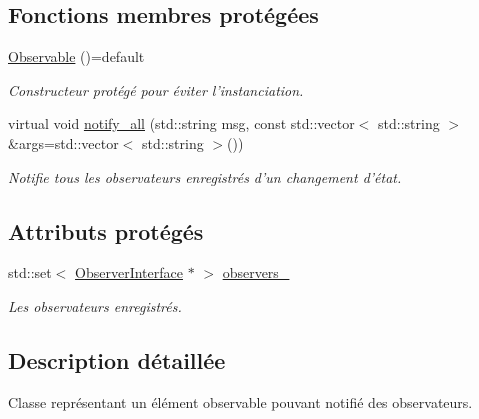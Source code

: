 \subsection*{Fonctions membres protégées}
\begin{DoxyCompactItemize}
\item 
\hypertarget{classObservable_ab3559b2daa90b06b123089508b3d193d}{\hyperlink{classObservable_ab3559b2daa90b06b123089508b3d193d}{Observable} ()=default}\label{classObservable_ab3559b2daa90b06b123089508b3d193d}

\begin{DoxyCompactList}\small\item\em Constructeur protégé pour éviter l'instanciation. \end{DoxyCompactList}\item 
\hypertarget{classObservable_a0ea369066b16b465fa95c975cd69615a}{virtual void \hyperlink{classObservable_a0ea369066b16b465fa95c975cd69615a}{notify\+\_\+all} (std\+::string msg, const std\+::vector$<$ std\+::string $>$ \&args=std\+::vector$<$ std\+::string $>$())}\label{classObservable_a0ea369066b16b465fa95c975cd69615a}

\begin{DoxyCompactList}\small\item\em Notifie tous les observateurs enregistrés d'un changement d'état. \end{DoxyCompactList}\end{DoxyCompactItemize}
\subsection*{Attributs protégés}
\begin{DoxyCompactItemize}
\item 
\hypertarget{classObservable_aadd5f7cdec9b55bfb230771dfb77a7f3}{std\+::set$<$ \hyperlink{classObserverInterface}{Observer\+Interface} $\ast$ $>$ \hyperlink{classObservable_aadd5f7cdec9b55bfb230771dfb77a7f3}{observers\+\_\+}}\label{classObservable_aadd5f7cdec9b55bfb230771dfb77a7f3}

\begin{DoxyCompactList}\small\item\em Les observateurs enregistrés. \end{DoxyCompactList}\end{DoxyCompactItemize}


\subsection{Description détaillée}
Classe représentant un élément observable pouvant notifié des observateurs. 

